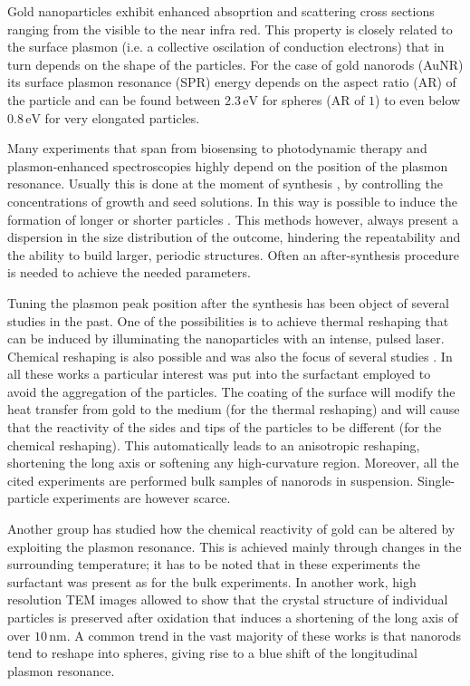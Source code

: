 \documentclass{article}
\begin{document}
Gold nanoparticles exhibit enhanced absoprtion and scattering cross sections
ranging from the visible to the near infra red. This property is closely related
to the surface plasmon (i.e. a collective oscilation of conduction electrons)
that in turn depends on the shape of the particles. For the case of gold
nanorods (AuNR) its surface plasmon resonance (SPR) energy depends on the aspect
ratio (AR) of the particle and can be found between $2.3\,\textrm{eV}$ for
spheres (AR of $1$) to even below $0.8\,\textrm{eV}$ for very elongated
particles.

Many experiments that span from biosensing \cite{Zijlstra2012} to photodynamic
therapy \cite{Zhao2014} and plasmon-enhanced spectroscopies \cite{Sivapalan2013}
highly depend on the position of the plasmon resonance. Usually this is done at
the moment of synthesis \cite{Gou2005}, by controlling the concentrations of
growth and seed solutions. In this way is possible to induce the formation of
longer or shorter particles \cite{Nikoobakht2003}. This methods however, always
present a dispersion in the size distribution of the outcome, hindering the
repeatability and the ability to build larger, periodic structures. Often an
after-synthesis procedure is needed to achieve the needed parameters.

Tuning the plasmon peak position after the synthesis has been object of several
studies in the past. One of the possibilities is to achieve thermal reshaping
that can be induced by illuminating the nanoparticles with an intense, pulsed
laser\cite{Link2000}\cite{Horiguchi2008}. Chemical reshaping is also possible
and was also the focus of several studies\cite{Yuan2015}
\cite{Carbo-Argibay2007} \cite{Rodriguez-Fernandez2005} \cite{Jana2002}. In all
these works a particular interest was put into the surfactant employed to avoid
the aggregation of the particles. The coating of the surface will modify the
heat transfer from gold to the medium (for the thermal reshaping) and will cause
that the reactivity of the sides and tips of the particles to be different (for
the chemical reshaping). This automatically leads to an anisotropic reshaping,
shortening the long axis or softening any high-curvature region. Moreover, all
the cited experiments are performed bulk samples of nanorods in suspension.
Single-particle experiments are however scarce.

Another group has studied how the chemical reactivity of gold \cite{Ni2012} can
be altered by exploiting the plasmon resonance. This is achieved mainly through
changes in the surrounding temperature; it has to be noted that in these
experiments the surfactant was present as for the bulk experiments. In another
work\cite{Tsung2006}, high resolution TEM images allowed to show that the
crystal structure of individual particles is preserved after oxidation that
induces a shortening of the long axis of over $10\,\textrm{nm}$. A common trend
in the vast majority of these works is that nanorods tend to reshape into
spheres, giving rise to a blue shift of the longitudinal plasmon resonance.
\end{document}
